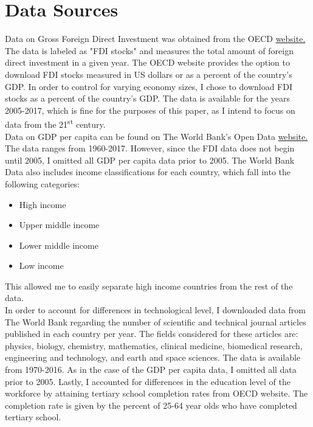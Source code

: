\documentclass{article}
\begin{document}
\section{Data Sources}
\quad Data on Gross Foreign Direct Investment was obtained from the OECD \href{https://data.oecd.org/}{website.} The data is labeled as "FDI stocks" and measures the total amount of foreign direct investment in a given year. The OECD website provides the option to download FDI stocks measured in US dollars or as a percent of the country's GDP. In order to control for varying economy sizes, I chose to download FDI stocks as a percent of the country's GDP. The data is available for the years 2005-2017, which is fine for the purposes of this paper, as I intend to focus on data from the 21\textsuperscript{st} century.\\
\null\quad Data on GDP per capita can be found on The World Bank's Open Data \href{https://data.worldbank.org/}{website.} The data ranges from 1960-2017. However, since the FDI data does not begin until 2005, I omitted all GDP per capita data prior to 2005. The World Bank Data also includes income classifications for each country, which fall into the following categories:
\begin{itemize}[noitemsep]
    \item High income
    \item Upper middle income
    \item Lower middle income
    \item Low income
\end{itemize}
This allowed me to easily separate high income countries from the rest of the data.\\
\null\quad In order to account for differences in technological level, I downloaded data from The World Bank regarding the number of scientific and technical journal articles published in each country per year. The fields considered for these articles are: physics, biology, chemistry, mathematics, clinical medicine, biomedical research, engineering and technology, and earth and space sciences. The data is available from 1970-2016. As in the case of the GDP per capita data, I omitted all data prior to 2005.
\null\quad Lastly, I accounted for differences in the education level of the workforce by attaining tertiary school completion rates from OECD website. The completion rate is given by the percent of 25-64 year olds who have completed tertiary school.
\newpage
\end{document}

